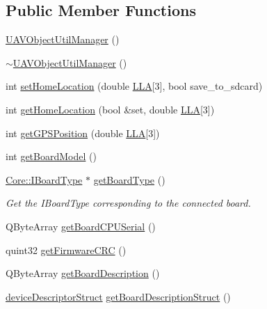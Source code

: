 \subsection*{\-Public \-Member \-Functions}
\begin{DoxyCompactItemize}
\item 
\hyperlink{group___u_a_v_objects_plugin_gaa646568941e8ce857e188b39c90cef6d}{\-U\-A\-V\-Object\-Util\-Manager} ()
\item 
\hyperlink{group___u_a_v_objects_plugin_gaffdcd54a6b9ce6a7dcf10beb881f71a7}{$\sim$\-U\-A\-V\-Object\-Util\-Manager} ()
\item 
int \hyperlink{group___u_a_v_objects_plugin_gafcfa22c5812ed36ca7a2d6e442ba1710}{set\-Home\-Location} (double \hyperlink{_o_p_plots_8m_ac4d07718b2724e836be86fbe0c8c5704}{\-L\-L\-A}\mbox{[}3\mbox{]}, bool save\-\_\-to\-\_\-sdcard)
\item 
int \hyperlink{group___u_a_v_objects_plugin_gac5e7b38a473a50f709fb6312ef511e59}{get\-Home\-Location} (bool \&set, double \hyperlink{_o_p_plots_8m_ac4d07718b2724e836be86fbe0c8c5704}{\-L\-L\-A}\mbox{[}3\mbox{]})
\item 
int \hyperlink{group___u_a_v_objects_plugin_gade02e26d0bb8afe69edff8a076882dcd}{get\-G\-P\-S\-Position} (double \hyperlink{_o_p_plots_8m_ac4d07718b2724e836be86fbe0c8c5704}{\-L\-L\-A}\mbox{[}3\mbox{]})
\item 
int \hyperlink{group___u_a_v_object_util_plugin_ga45c8f562def61c9273af2b243d981114}{get\-Board\-Model} ()
\item 
\hyperlink{class_core_1_1_i_board_type}{\-Core\-::\-I\-Board\-Type} $\ast$ \hyperlink{group___u_a_v_objects_plugin_gac3a1293716fa3eb310ed257ade7f6722}{get\-Board\-Type} ()
\begin{DoxyCompactList}\small\item\em \-Get the \-I\-Board\-Type corresponding to the connected board. \end{DoxyCompactList}\item 
\-Q\-Byte\-Array \hyperlink{group___u_a_v_object_util_plugin_ga11c8171d7e380e699b4edf9b6860a236}{get\-Board\-C\-P\-U\-Serial} ()
\item 
quint32 \hyperlink{group___u_a_v_objects_plugin_ga2aa3a13d1eb39329f28842887c6d7db6}{get\-Firmware\-C\-R\-C} ()
\item 
\-Q\-Byte\-Array \hyperlink{group___u_a_v_object_util_plugin_ga1c07eaa903b38480c6eb46b1a312f66e}{get\-Board\-Description} ()
\item 
\hyperlink{classdevice_descriptor_struct}{device\-Descriptor\-Struct} \hyperlink{group___u_a_v_objects_plugin_ga37ed95a95ca8906a45b06bb7174b1158}{get\-Board\-Description\-Struct} ()

\end{DoxyCompactItemize}
